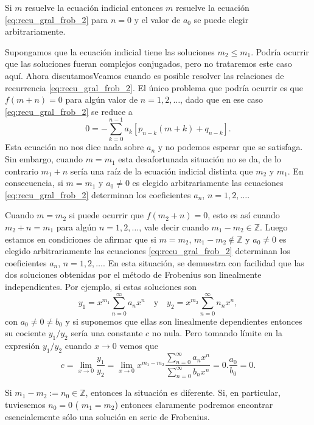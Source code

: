 \documentclass{article}
\newcounter{lem_cont}
\newcounter{ejem_cont}
\renewcommand{\emph}[1]{\textcolor[rgb]{0,0,1}{#1}}
\begin{document}
Si $m$ resuelve la ecuación indicial entonces $m$ resuelve la ecuación \eqref{eq:recu_gral_frob_2} para $n=0$ y el valor de $a_0$ se puede elegir arbitrariamente. 

Supongamos que la ecuación indicial tiene las soluciones $m_2\leq m_1$. Podría ocurrir que las soluciones fueran complejos conjugados, pero no trataremos este caso aquí. Ahora discutamosVeamos  cuando es posible resolver las relaciones de recurrencia \eqref{eq:recu_gral_frob_2}. El único problema que podría ocurrir es que  $f(m+n)=0$ para algún valor de $n=1,2,\ldots$, dado que en ese caso \eqref{eq:recu_gral_frob_2} se reduce a 
\begin{equation}\label{eq:ec_enter} 0=-\sum_{k=0}^{n-1}a_k\left[p_{n-k}(m+k) +
q_{n-k}\right].
\end{equation}
Esta ecuación no nos dice nada sobre $a_n$ y no podemos esperar que se satisfaga. Sin embargo, cuando $m=m_1$ esta desafortunada situación no se da, de lo contrario  $m_1+n$ sería una raíz de la ecuación indicial distinta que $m_2$ y $m_1$. En consecuencia, \emph{si $m=m_1$ y $a_0\neq 0$ es elegido arbitrariamente las ecuaciones \eqref{eq:recu_gral_frob_2} determinan los coeficientes $a_n$, $n=1,2,\ldots$.}

Cuando $m=m_2$ si puede ocurrir que $f(m_2+n)=0$, esto es así cuando $m_2+n=m_1$ para algún $n=1,2,\ldots$, vale decir cuando $m_1-m_2\in\mathbb{Z}$.  Luego estamos en condiciones de afirmar que \emph{si $m=m_2$, $m_1-m_2\notin \mathbb{Z}$ y $a_0\neq 0$ es elegido arbitrariamente las ecuaciones \eqref{eq:recu_gral_frob_2} determinan los coeficientes $a_n$, $n=1,2,\ldots$.} En esta situación, se demuestra con facilidad que las dos soluciones obtenidas por el método de Frobenius son linealmente independientes. Por ejemplo, si estas soluciones son
\[y_1=x^{m_1}\sum_{n=0}^{\infty}a_nx^n\quad\text{y}\quad y_2=x^{m_2}\sum_{n=0}^{\infty}n_nx^n,\]
con $a_0\neq 0\neq b_0$ y si suponemos que ellas son linealmente dependientes entonces su cociente $y_1/y_2$ sería una constante $c$  no nula. Pero tomando límite en la expresión $y_1/y_2$ cuando $x\to 0$ vemos que
\[c=\lim_{x\to 0} \frac{y_1}{y_2}=\lim_{x\to 0} x^{m_1-m_2}\frac{\sum_{n=0}^{\infty}a_nx^n}{ \sum_{n=0}^{\infty}b_nx^n  }=0.\frac{a_0}{b_0}=0.\]

Si $m_1-m_2:=n_0\in\mathbb{Z}$, entonces la situación es diferente. Si, en particular,  \emph{tuviesemos $n_0=0$ ( $m_1=m_2$) entonces claramente podremos encontrar esencialemente sólo una solución en serie de Frobenius.}   
\end{document}
